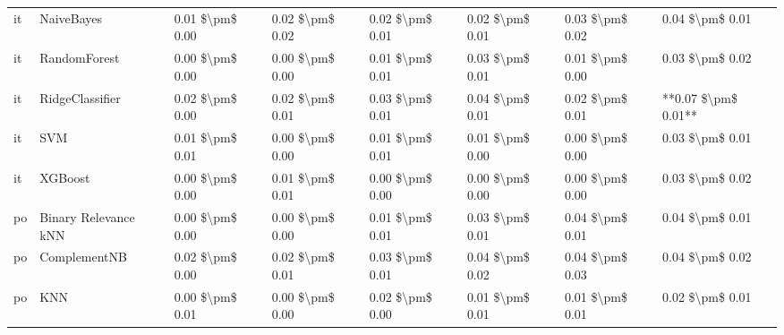 \begin{tabular}{llllllll}
      it &                      NaiveBayes & 0.01 \$\textbackslash pm\$ 0.00 &           0.02 \$\textbackslash pm\$ 0.02 &       0.02 \$\textbackslash pm\$ 0.01 &        0.02 \$\textbackslash pm\$ 0.01 &                         0.03 \$\textbackslash pm\$ 0.02 &     0.04 \$\textbackslash pm\$ 0.01 \\
      it &                    RandomForest & 0.00 \$\textbackslash pm\$ 0.00 &           0.00 \$\textbackslash pm\$ 0.00 &       0.01 \$\textbackslash pm\$ 0.01 &        0.03 \$\textbackslash pm\$ 0.01 &                         0.01 \$\textbackslash pm\$ 0.00 &     0.03 \$\textbackslash pm\$ 0.02 \\
      it &                 RidgeClassifier & 0.02 \$\textbackslash pm\$ 0.00 &           0.02 \$\textbackslash pm\$ 0.01 &       0.03 \$\textbackslash pm\$ 0.01 &        0.04 \$\textbackslash pm\$ 0.01 &                         0.02 \$\textbackslash pm\$ 0.01 & **0.07 \$\textbackslash pm\$ 0.01** \\
      it &                             SVM & 0.01 \$\textbackslash pm\$ 0.01 &           0.00 \$\textbackslash pm\$ 0.00 &       0.01 \$\textbackslash pm\$ 0.01 &        0.01 \$\textbackslash pm\$ 0.00 &                         0.00 \$\textbackslash pm\$ 0.00 &     0.03 \$\textbackslash pm\$ 0.01 \\
      it &                         XGBoost & 0.00 \$\textbackslash pm\$ 0.00 &           0.01 \$\textbackslash pm\$ 0.01 &       0.00 \$\textbackslash pm\$ 0.00 &        0.00 \$\textbackslash pm\$ 0.00 &                         0.00 \$\textbackslash pm\$ 0.00 &     0.03 \$\textbackslash pm\$ 0.02 \\
      po &            Binary Relevance kNN & 0.00 \$\textbackslash pm\$ 0.00 &           0.00 \$\textbackslash pm\$ 0.00 &       0.01 \$\textbackslash pm\$ 0.01 &        0.03 \$\textbackslash pm\$ 0.01 &                         0.04 \$\textbackslash pm\$ 0.01 &     0.04 \$\textbackslash pm\$ 0.01 \\
      po &                    ComplementNB & 0.02 \$\textbackslash pm\$ 0.00 &           0.02 \$\textbackslash pm\$ 0.01 &       0.03 \$\textbackslash pm\$ 0.01 &        0.04 \$\textbackslash pm\$ 0.02 &                         0.04 \$\textbackslash pm\$ 0.03 &     0.04 \$\textbackslash pm\$ 0.02 \\
      po &                             KNN & 0.00 \$\textbackslash pm\$ 0.01 &           0.00 \$\textbackslash pm\$ 0.00 &       0.02 \$\textbackslash pm\$ 0.00 &        0.01 \$\textbackslash pm\$ 0.01 &                         0.01 \$\textbackslash pm\$ 0.01 &     0.02 \$\textbackslash pm\$ 0.01 \\

\end{tabular}
